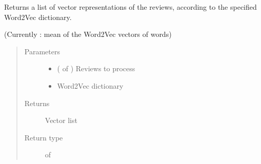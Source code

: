 \documentclass[letterpaper,10pt,english]{sphinxmanual}
\begin{document}
\begin{fulllineitems}
\label{\detokenize{learning:loacore.learning.word2vec.reviews_2_vec}}
Returns a list of vector representations of the reviews, according to the specified Word2Vec dictionary.

(Currently : mean of the Word2Vec vectors of words)
\begin{quote}\begin{description}
\item[{Parameters}] \leavevmode\begin{itemize}
\item {} 
 ( of {\hyperref[\detokenize{classes:loacore.classes.classes.Review}]{}}) \textendash{} Reviews to process

\item {} 
 \textendash{} Word2Vec dictionary

\end{itemize}

\item[{Returns}] \leavevmode
Vector list

\item[{Return type}] \leavevmode

 of 


\end{description}\end{quote}

\end{fulllineitems}

\end{document}
